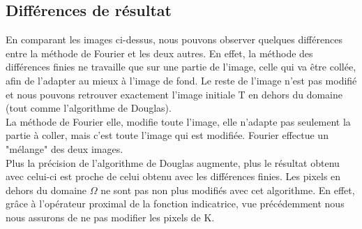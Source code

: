 \subsection{Différences de résultat}
En comparant les images ci-dessus, nous pouvons observer quelques différences entre la méthode de Fourier et les deux autres. En effet, la méthode des différences finies ne travaille que sur une partie de l'image, celle qui va être collée, afin de l'adapter au mieux à l'image de fond. Le reste de l'image n'est pas modifié et nous pouvons retrouver exactement l'image initiale T en dehors du domaine (tout comme l'algorithme de Douglas). \\
La méthode de Fourier elle, modifie toute l'image, elle n'adapte pas seulement la partie à coller, mais c'est toute l'image qui est modifiée. Fourier effectue un "mélange" des deux images. \\
Plus la précision de l'algorithme de Douglas augmente, plus le résultat obtenu avec celui-ci est proche de celui obtenu avec les différences finies. Les pixels en dehors du domaine $\Omega$ ne sont pas non plus modifiés avec cet algorithme. En effet, grâce à l'opérateur proximal de la fonction indicatrice, vue précédemment nous nous assurons de ne pas modifier les pixels de K.
